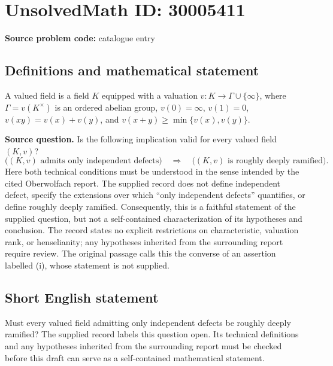 \documentclass[11pt]{article}
\begin{document}
\section*{UnsolvedMath ID: 30005411}
\textbf{Source problem code:} catalogue entry
\subsection{Definitions and mathematical statement}
A valued field is a field \(K\) equipped with a valuation \(v:K\to\Gamma\cup\{\infty\}\), where \(\Gamma=v(K^\times)\) is an ordered abelian group, \(v(0)=\infty\), \(v(1)=0\), \(v(xy)=v(x)+v(y)\), and \(v(x+y)\geq\min\{v(x),v(y)\}\).

\textbf{Source question.} Is the following implication valid for every valued field \((K,v)\)?
\[
\bigl((K,v)\text{ admits only independent defects}\bigr)
\quad\Longrightarrow\quad
\bigl((K,v)\text{ is roughly deeply ramified}\bigr).
\]
Here both technical conditions must be understood in the sense intended by the cited Oberwolfach report. The supplied record does not define independent defect, specify the extensions over which ``only independent defects'' quantifies, or define roughly deeply ramified. Consequently, this is a faithful statement of the supplied question, but not a self-contained characterization of its hypotheses and conclusion. The record states no explicit restrictions on characteristic, valuation rank, or henselianity; any hypotheses inherited from the surrounding report require review. The original passage calls this the converse of an assertion labelled (i), whose statement is not supplied.
\subsection{Short English statement}
Must every valued field admitting only independent defects be roughly deeply ramified? The supplied record labels this question open. Its technical definitions and any hypotheses inherited from the surrounding report must be checked before this draft can serve as a self-contained mathematical statement.
\end{document}
